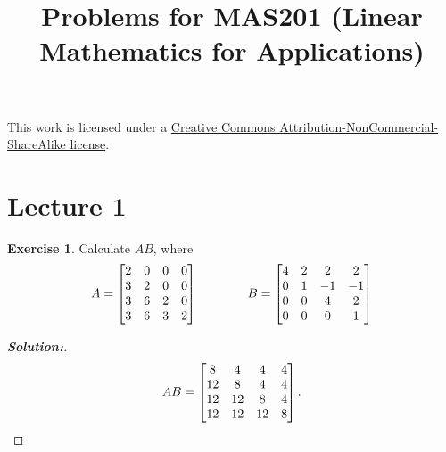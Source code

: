 \documentclass[a4paper]{amsart}
\title{Problems for MAS201 (Linear Mathematics for Applications)}
\theoremstyle{definition}
\newtheorem{exercise}{Exercise}
\newenvironment{solution}{\begin{proof}[\textbf{Solution:}] \vphantom{u}}{\end{proof}}
\begin{document}
\maketitle

\begin{center}
 This work is licensed under a 
 \href{https://creativecommons.org/licenses/by-nc-sa/3.0/deed.en}{
  Creative Commons Attribution-NonCommercial-ShareAlike license}.
 
 \bigskip

 \doclicenseImage 
\end{center}

\newpage

\section{Lecture 1}

\begin{exercise}\label{ex-mat-prod-i}
 Calculate $AB$, where 
 \[ A = \left[\begin{matrix} 2&0&0&0 \\ 3&2&0&0 \\ 3&6&2&0 \\ 3&6&3&2 \end{matrix}\right] 
    \hspace{4em}
    B = \left[\begin{matrix} 4&2&2&2 \\ 0&1&-1&-1 \\ 0&0&4&2 \\ 0&0&0&1 \end{matrix}\right]
 \]
\end{exercise}
\begin{solution}
 \[ AB = \left[\begin{matrix}  8 &  4 &  4 &  4 \\
              12 &  8 &  4 &  4 \\
              12 & 12 &  8 &  4 \\
              12 & 12 & 12 &  8
         \end{matrix}\right] .
 \]
\end{solution}
\end{document}
